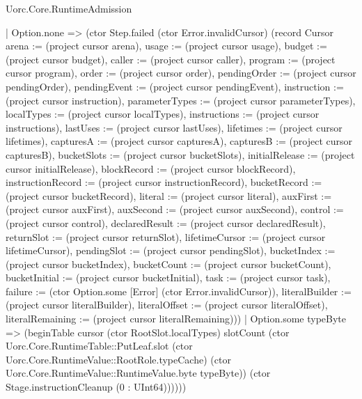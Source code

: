 \begin{lexlean}{Uorc.Core.RuntimeAdmission}
\begin{semanticmodule}
{            | Option.none => (ctor Step.failed (ctor Error.invalidCursor) (record Cursor {arena := (project cursor arena), usage := (project cursor usage), budget := (project cursor budget), caller := (project cursor caller), program := (project cursor program), order := (project cursor order), pendingOrder := (project cursor pendingOrder), pendingEvent := (project cursor pendingEvent), instruction := (project cursor instruction), parameterTypes := (project cursor parameterTypes), localTypes := (project cursor localTypes), instructions := (project cursor instructions), lastUses := (project cursor lastUses), lifetimes := (project cursor lifetimes), capturesA := (project cursor capturesA), capturesB := (project cursor capturesB), bucketSlots := (project cursor bucketSlots), initialRelease := (project cursor initialRelease), blockRecord := (project cursor blockRecord), instructionRecord := (project cursor instructionRecord), bucketRecord := (project cursor bucketRecord), literal := (project cursor literal), auxFirst := (project cursor auxFirst), auxSecond := (project cursor auxSecond), control := (project cursor control), declaredResult := (project cursor declaredResult), returnSlot := (project cursor returnSlot), lifetimeCursor := (project cursor lifetimeCursor), pendingSlot := (project cursor pendingSlot), bucketIndex := (project cursor bucketIndex), bucketCount := (project cursor bucketCount), bucketInitial := (project cursor bucketInitial), task := (project cursor task), failure := (ctor Option.some [Error] (ctor Error.invalidCursor)), literalBuilder := (project cursor literalBuilder), literalOffset := (project cursor literalOffset), literalRemaining := (project cursor literalRemaining)}))
            | Option.some typeByte => (beginTable cursor (ctor RootSlot.localTypes) slotCount (ctor Uorc.Core.RuntimeTable::PutLeaf.slot (ctor Uorc.Core.RuntimeValue::RootRole.typeCache) (ctor Uorc.Core.RuntimeValue::RuntimeValue.byte typeByte)) (ctor Stage.instructionCleanup (0 : UInt64))))))
}
\end{semanticmodule}
\end{lexlean}
